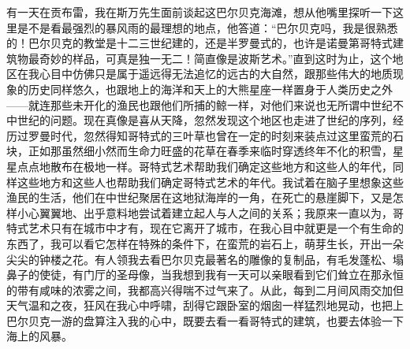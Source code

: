 \par 有一天在贡布雷，我在斯万先生面前谈起这巴尔贝克海滩，想从他嘴里探听一下这里是不是看最强烈的暴风雨的最理想的地点，他答道：“巴尔贝克吗，我是很熟悉的！巴尔贝克的教堂是十二三世纪建的，还是半罗曼式的，也许是诺曼第哥特式建筑物最奇妙的样品，可真是独一无二！简直像是波斯艺术。”直到这时为止，这个地区在我心目中仿佛只是属于遥远得无法追忆的远古的大自然，跟那些伟大的地质现象的历史同样悠久，也跟地上的海洋和天上的大熊星座一样置身于人类历史之外——就连那些未开化的渔民也跟他们所捕的鲸一样，对他们来说也无所谓中世纪不中世纪的问题。现在真像是喜从天降，忽然发现这个地区也走进了世纪的序列，经历过罗曼时代，忽然得知哥特式的三叶草也曾在一定的时刻来装点过这里蛮荒的石块，正如那虽然细小然而生命力旺盛的花草在春季来临时穿透终年不化的积雪，星星点点地散布在极地一样。哥特式艺术帮助我们确定这些地方和这些人的年代，同样这些地方和这些人也帮助我们确定哥特式艺术的年代。我试着在脑子里想象这些渔民的生活，他们在中世纪聚居在这地狱海岸的一角，在死亡的悬崖脚下，又是怎样小心翼翼地、出乎意料地尝试着建立起人与人之间的关系；我原来一直以为，哥特式艺术只有在城市中才有，现在它离开了城市，在我心目中就更是一个有生命的东西了，我可以看它怎样在特殊的条件下，在蛮荒的岩石上，萌芽生长，开出一朵尖尖的钟楼之花。有人领我去看巴尔贝克最著名的雕像的复制品，有毛发蓬松、塌鼻子的使徒，有门厅的圣母像，当我想到我有一天可以亲眼看到它们耸立在那永恒的带有咸味的浓雾之间，我都高兴得喘不过气来了。从此，每到二月间风雨交加但天气温和之夜，狂风在我心中呼啸，刮得它跟卧室的烟囱一样猛烈地晃动，也把上巴尔贝克一游的盘算注入我的心中，既要去看一看哥特式的建筑，也要去体验一下海上的风暴。
